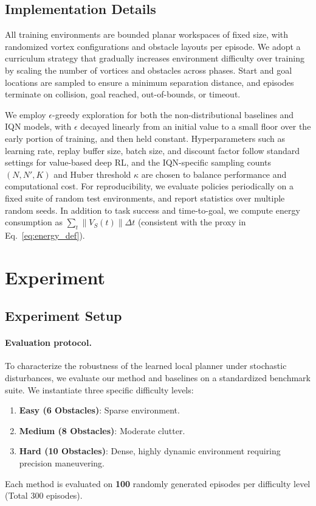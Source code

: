 \documentclass[runningheads]{llncs}
\begin{document}
\subsection{Implementation Details}
\label{sec:method_impl}
All training environments are bounded planar workspaces of fixed size, with randomized vortex configurations and obstacle layouts per episode. We adopt a curriculum strategy that gradually increases environment difficulty over training by scaling the number of vortices and obstacles across phases. Start and goal locations are sampled to ensure a minimum separation distance, and episodes terminate on collision, goal reached, out-of-bounds, or timeout.

We employ $\epsilon$-greedy exploration for both the non-distributional baselines and IQN models, with $\epsilon$ decayed linearly from an initial value to a small floor over the early portion of training, and then held constant. Hyperparameters such as learning rate, replay buffer size, batch size, and discount factor follow standard settings for value-based deep RL, and the IQN-specific sampling counts $(N,N',K)$ and Huber threshold $\kappa$ are chosen to balance performance and computational cost.
For reproducibility, we evaluate policies periodically on a fixed suite of random test environments, and report statistics over multiple random seeds. In addition to task success and time-to-goal, we compute energy consumption as $\sum_t \|V_S(t)\|\Delta t$ (consistent with the proxy in Eq.~\eqref{eq:energy_def}).
\section{Experiment}
\label{sec:experiments}

\subsection{Experiment Setup}
\label{sec:exp_setup}

\paragraph{Evaluation protocol.}
To characterize the robustness of the learned local planner under stochastic disturbances, we evaluate our method and baselines on a standardized benchmark suite.
We instantiate three specific difficulty levels:
\begin{enumerate}
    \item \textbf{Easy (6 Obstacles)}: Sparse environment.
    \item \textbf{Medium (8 Obstacles)}: Moderate clutter.
    \item \textbf{Hard (10 Obstacles)}: Dense, highly dynamic environment requiring precision maneuvering.
\end{enumerate}
Each method is evaluated on \textbf{100} randomly generated episodes per difficulty level (Total 300 episodes).
\end{document}
